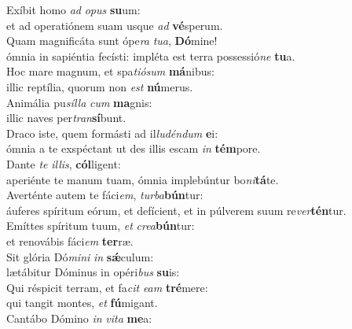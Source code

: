 \evenverse Exíbit homo \textit{ad} \textit{o}\textit{pus} \textbf{su}um:~\*\\
\evenverse et ad operatiónem suam usque \textit{ad} \textbf{vé}sperum.\\
\oddverse Quam magnificáta sunt ópe\textit{ra} \textit{tu}\textit{a}, \textbf{Dó}mine!~\*\\
\oddverse ómnia in sapiéntia fecísti: impléta est terra possessió\textit{ne} \textbf{tu}a.\\
\evenverse Hoc mare magnum, et spa\textit{ti}\textit{ó}\textit{sum} \textbf{má}nibus:~\*\\
\evenverse illic reptília, quorum non \textit{est} \textbf{nú}merus.\\
\oddverse Animália pu\textit{síl}\textit{la} \textit{cum} \textbf{ma}gnis:~\*\\
\oddverse illic naves per\textit{tran}\textbf{sí}bunt.\\
\evenverse Draco iste, quem formásti ad il\textit{lu}\textit{dén}\textit{dum} \textbf{e}i:~\*\\
\evenverse ómnia a te exspéctant ut des illis escam \textit{in} \textbf{tém}pore.\\
\oddverse Dante \textit{te} \textit{il}\textit{lis}, \textbf{cól}ligent:~\*\\
\oddverse aperiénte te manum tuam, ómnia implebúntur bo\textit{ni}\textbf{tá}te.\\
\evenverse Averténte autem te fáci\textit{em}, \textit{tur}\textit{ba}\textbf{bún}tur:~\*\\
\evenverse áuferes spíritum eórum, et defícient, et in púlverem suum re\textit{ver}\textbf{tén}tur.\\
\oddverse Emíttes spíritum tuum, \textit{et} \textit{cre}\textit{a}\textbf{bún}tur:~\*\\
\oddverse et renovábis fáci\textit{em} \textbf{ter}ræ.\\
\evenverse Sit glória Dó\textit{mi}\textit{ni} \textit{in} \textbf{sǽ}culum:~\*\\
\evenverse lætábitur Dóminus in opéri\textit{bus} \textbf{su}is:\\
\oddverse Qui réspicit terram, et fa\textit{cit} \textit{e}\textit{am} \textbf{tré}mere:~\*\\
\oddverse qui tangit montes, \textit{et} \textbf{fú}migant.\\
\evenverse Cantábo Dómino \textit{in} \textit{vi}\textit{ta} \textbf{me}a:~\*\\
